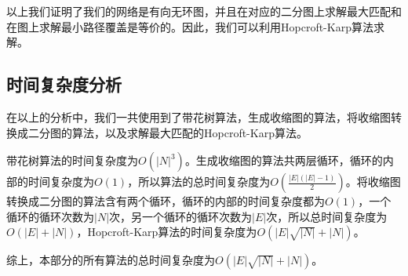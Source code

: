 \par
以上我们证明了我们的网络是有向无环图，并且在对应的二分图上求解最大匹配和在图上求解最小路径覆盖是等价的。因此，我们可以利用Hopcroft-Karp算法求解。


\subsection{时间复杂度分析}
在以上的分析中，我们一共使用到了带花树算法，生成收缩图的算法，将收缩图转换成二分图的算法，以及求解最大匹配的Hopcroft-Karp算法。
\par
带花树算法的时间复杂度为$O(|N|^3)$。生成收缩图的算法共两层循环，循环的内部的时间复杂度为$O(1)$，所以算法的总时间复杂度为$O(\frac{|E|(|E|-1)}{2})$。将收缩图转换成二分图的算法含有两个循环，循环的内部的时间复杂度都为$O(1)$，一个循环的循环次数为$|N|$次，另一个循环的循环次数为$|E|$次，所以总时间复杂度为$O(|E|+|N|)$，Hopcroft-Karp算法的时间复杂度为$O(|E|\sqrt{|N|}+|N|)$。
\par
综上，本部分的所有算法的总时间复杂度为$O(|E|\sqrt{|N|}+|N|)$。